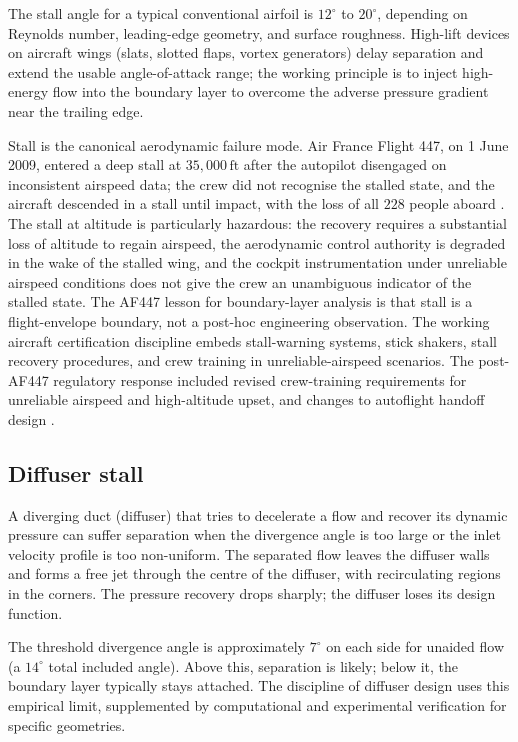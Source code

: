 The stall angle for a typical conventional airfoil is $12^{\circ}$
to $20^{\circ}$, depending on Reynolds number, leading-edge
geometry, and surface roughness. High-lift devices on aircraft
wings (slats, slotted flaps, vortex generators) delay separation
and extend the usable angle-of-attack range; the working principle
is to inject high-energy flow into the boundary layer to overcome
the adverse pressure gradient near the trailing edge.

Stall is the canonical aerodynamic failure mode. Air France Flight
447, on 1 June 2009, entered a deep stall at $35{,}000\,\text{ft}$
after the autopilot disengaged on inconsistent airspeed data; the
crew did not recognise the stalled state, and the aircraft
descended in a stall until impact, with the loss of all $228$
people aboard \cite{acc:bea-af447}. The stall at altitude is
particularly hazardous: the recovery requires a substantial loss
of altitude to regain airspeed, the aerodynamic control
authority is degraded in the wake of the stalled wing, and the
cockpit instrumentation under unreliable airspeed conditions does
not give the crew an unambiguous indicator of the stalled state.
The AF447 lesson for boundary-layer analysis is that stall is a
flight-envelope boundary, not a post-hoc engineering observation.
The working aircraft certification discipline embeds stall-warning
systems, stick shakers, stall recovery procedures, and crew
training in unreliable-airspeed scenarios. The post-AF447
regulatory response included revised crew-training requirements
for unreliable airspeed and high-altitude upset, and changes to
autoflight handoff design \cite{acc:bea-af447}.

\subsection{Diffuser stall}

A diverging duct (diffuser) that tries to decelerate a flow and
recover its dynamic pressure can suffer separation when the
divergence angle is too large or the inlet velocity profile is too
non-uniform. The separated flow leaves the diffuser walls and
forms a free jet through the centre of the diffuser, with
recirculating regions in the corners. The pressure recovery drops
sharply; the diffuser loses its design function.

The threshold divergence angle is approximately $7^{\circ}$ on
each side for unaided flow (a $14^{\circ}$ total included angle).
Above this, separation is likely; below it, the boundary layer
typically stays attached. The discipline of diffuser design uses
this empirical limit, supplemented by computational and
experimental verification for specific geometries.

